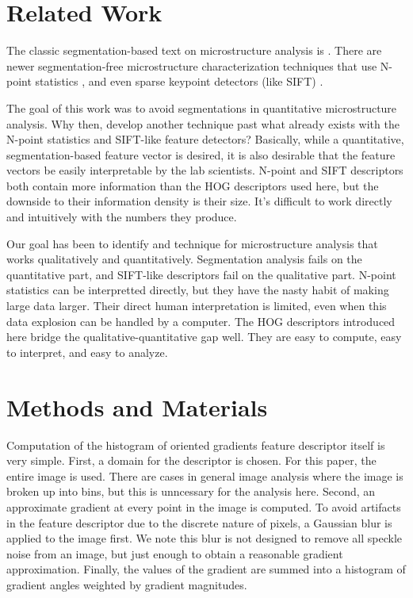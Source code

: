 \documentclass[review]{elsarticle}
\begin{document}
	\section{Related Work}
	The classic segmentation-based text on microstructure analysis is \cite{underwood}. There are newer segmentation-free microstructure characterization techniques that use N-point statistics \cite{kalidindi1, kalidindi2}, and even sparse keypoint detectors (like SIFT) \cite{decost}.

	The goal of this work was to avoid segmentations in quantitative microstructure analysis. Why then, develop another technique past what already exists with the N-point statistics and SIFT-like feature detectors? Basically, while a quantitative, segmentation-based feature vector is desired, it is also desirable that the feature vectors be easily interpretable by the lab scientists. N-point and SIFT descriptors both contain more information than the HOG descriptors used here, but the downside to their information density is their size. It's difficult to work directly and intuitively with the numbers they produce.
	
	Our goal has been to identify and technique for microstructure analysis that works qualitatively and quantitatively. Segmentation analysis fails on the quantitative part, and SIFT-like descriptors fail on the qualitative part. N-point statistics can be interpretted directly, but they have the nasty habit of making large data larger. Their direct human interpretation is limited, even when this data explosion can be handled by a computer. The HOG descriptors introduced here bridge the qualitative-quantitative gap well. They are easy to compute, easy to interpret, and easy to analyze.

	\section{Methods and Materials}
	Computation of the histogram of oriented gradients feature descriptor itself is very simple. First, a domain for the descriptor is chosen. For this paper, the entire image is used. There are cases in general image analysis where the image is broken up into bins, but this is unncessary for the analysis here. Second, an approximate gradient at every point in the image is computed. To avoid artifacts in the feature descriptor due to the discrete nature of pixels, a Gaussian blur is applied to the image first. We note this blur is not designed to remove all speckle noise from an image, but just enough to obtain a reasonable gradient approximation. Finally, the values of the gradient are summed into a histogram of gradient angles weighted by gradient magnitudes.
\end{document}
